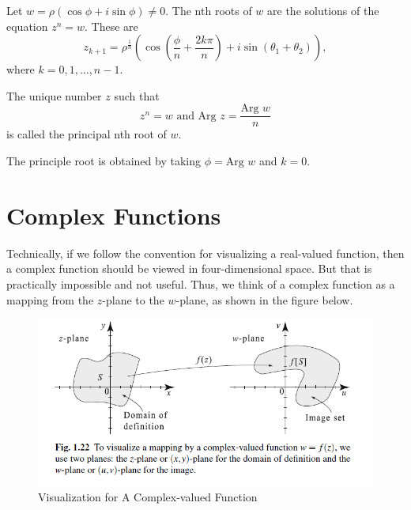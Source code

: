 \documentclass[11pt,reqno,oneside,a4paper]{article}
\begin{document}
Let $w = \rho (\cos \phi + i\sin \phi) \neq 0.$ The nth roots of $w$ are the solutions of the equation $z^n= w$. These are
$$z_{k+1} = \rho^{\frac{1}{n}}(\cos(\frac{\phi}{n}+\frac{2k\pi}{n})+ i\sin(\theta_1 +\theta_2)),$$
where $k = 0,1,\dots,n-1$.

The unique number $z$ such that 
$$z^n =w \text{ and Arg }z = \frac{\text{Arg }w}{n}$$
is called the principal nth root of $w$.

The principle root is obtained by taking $\phi = \text{Arg }w$ and $k=0$. 


\section{Complex Functions}

Technically, if we follow the convention for visualizing a real-valued function, then a complex function should be viewed in four-dimensional space. But that is practically impossible and not useful. Thus, we think of a complex function as a mapping from the $z$-plane to the $w$-plane, as shown in the figure below. 

\begin{figure}[htp]
	\centering
	\includegraphics[width=0.8\linewidth]{gfx/complex-function-vis.png}
	\caption{Visualization for A Complex-valued Function}
	\label{fig:complex-function-vis}
\end{figure}
\end{document}

